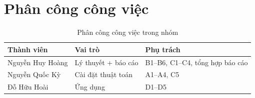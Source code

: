 \section{Phân công công việc}\label{sec:contrib}

\begin{table}[H]
\centering
\caption{Phân công công việc trong nhóm}\label{tab:contrib}
\begin{tabular}{@{}lll@{}}
\toprule
Thành viên & Vai trò & Phụ trách \\
\midrule
Nguyễn Huy Hoàng & Lý thuyết + báo cáo & B1--B6, C1--C4, tổng hợp báo cáo \\
Nguyễn Quốc Kỳ & Cài đặt thuật toán & A1--A4, C5 \\
Đỗ Hữu Hoài & Ứng dụng & D1--D5 \\
\bottomrule
\end{tabular}
\end{table}
